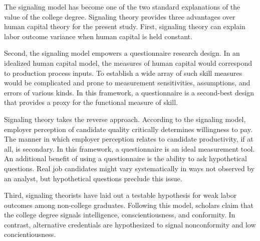 \documentclass[review]{elsarticle}
\begin{document}
The signaling model has become one of the two standard explanations of the value of the college degree.
Signaling theory provides three advantages over human capital theory for the present study.
First, signaling theory can explain labor outcome variance when human capital is held constant.

Second, the signaling model empowers a questionnaire research design.
In an idealized human capital model, the measures of human capital would correspond to production process inputs.
To establish a wide array of such skill measures would be complicated and prone to measurement sensitivities, assumptions, and errors of various kinds.
In this framework, a questionnaire is a second-best design that provides a proxy for the functional measure of skill.

Signaling theory takes the reverse approach.
According to the signaling model, employer perception of candidate quality critically determines willingness to pay.
The manner in which employer perception relates to candidate productivity, if at all, is secondary.
In this framework, a questionnaire is an ideal measurement tool.
An additional benefit of using a questionnaire is the ability to ask hypothetical questions.
Real job candidates might vary systematically in ways not observed by an analyst,
but hypothetical questions preclude this issue.

Third, signaling theorists have laid out a testable hypothesis for weak labor outcomes among non-college graduates.
Following this model, scholars claim that the college degree signals intelligence, conscientiousness, and conformity\cite{caplan2018case}.
In contrast, alternative credentials are hypothesized to signal nonconformity and low concientiousness.
\end{document}
